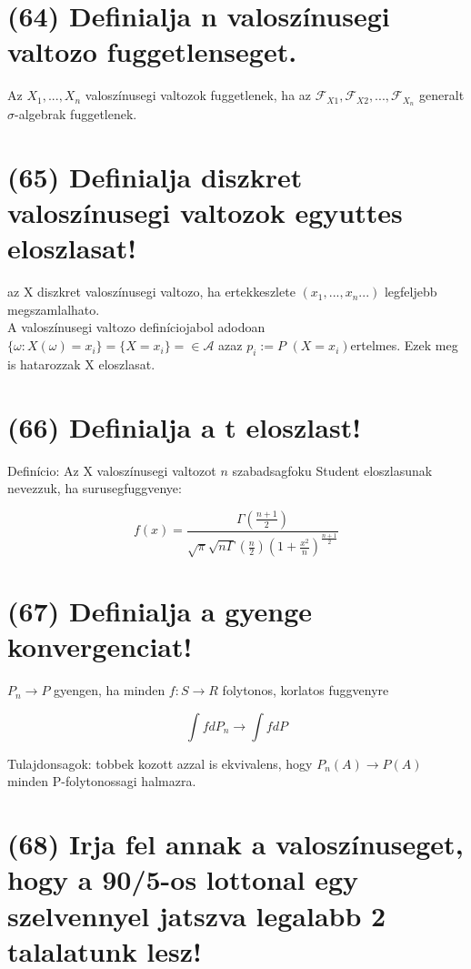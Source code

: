 \documentclass[12p]{article}
\begin{document}
\section{(64) Definialja n valoszínusegi valtozo fuggetlenseget.}

 Az $X_1,...,X_n$ valoszínusegi valtozok fuggetlenek, ha az $\mathscr{F}_{X1}, \mathscr{F}_{X2} ,...,\mathscr{F}_{X_n}$ generalt $\sigma$-algebrak fuggetlenek.

\section{(65) Definialja diszkret valoszínusegi valtozok egyuttes eloszlasat!}

az X diszkret valoszínusegi valtozo, ha ertekkeszlete $(x_1 ,..., x_n...)$ legfeljebb megszamlalhato.\\
A valoszínusegi valtozo definíciojabol adodoan $\{\omega:X(\omega)= x_i\}=\{X=x_i\}= \in \mathscr{A}$ azaz $p_i:=P$ $(X=x_i)$ertelmes. Ezek meg is hatarozzak X eloszlasat.

\section{(66) Definialja a t eloszlast!}

Definício:  Az X  valoszínusegi valtozot $n$ szabadsagfoku Student eloszlasunak nevezzuk, ha surusegfuggvenye:

$$f(x) = \frac{\Gamma \left(\frac{n+1}{2}\right)}{\sqrt{\pi} \sqrt{n \Gamma} \left(\frac{n}{2}\right) \left(1 + \frac{x^2}{n}\right)^{\frac{n+1}{2}}}$$

\section{(67) Definialja a gyenge konvergenciat!}

$P_n \rightarrow P$ gyengen, ha minden $f: S \rightarrow R$ folytonos, korlatos fuggvenyre

$$\int fdP_n \rightarrow \int fdP$$

Tulajdonsagok: tobbek kozott azzal is
ekvivalens, hogy $P_n(A) \rightarrow P(A)$ minden P-folytonossagi halmazra.

\section{(68) Irja fel annak a valoszínuseget, hogy a 90/5-os lottonal egy szelvennyel jatszva legalabb 2 talalatunk lesz!}
\end{document}
